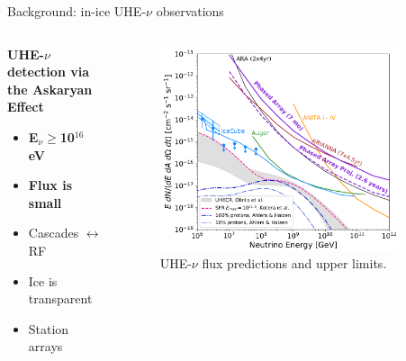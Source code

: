 \documentclass{beamer}
\begin{document}
\begin{frame}{Background: in-ice UHE-$\nu$ observations}
\small
\begin{columns}[T]
\begin{column}{0.32\textwidth}
\textbf{\alert{UHE-$\nu$ detection via the Askaryan Effect}}
\begin{itemize}
\item \textbf{E$_{\nu} \geq $10$^{16}$ eV}
\item \textbf{Flux is small}
\item Cascades $\leftrightarrow$ RF
\item Ice is transparent
\item Station arrays
\end{itemize}
\end{column}
\begin{column}{0.68\textwidth}
\begin{figure}
\centering
\includegraphics[width=0.9\textwidth]{flux.png}
\caption{\footnotesize UHE-$\nu$ flux predictions and upper limits.}
\end{figure}
\end{column}
\end{columns}
\end{frame}
\end{document}
